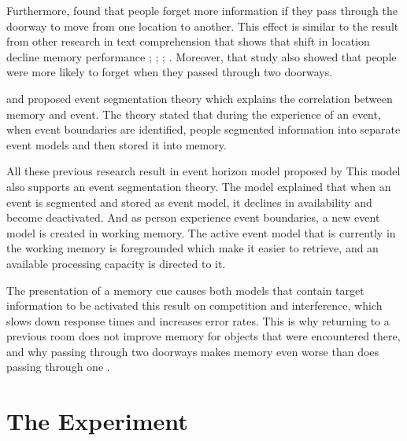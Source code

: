 
Furthermore, \cite{Radvansky2010} found that people forget more information if they pass through the doorway to move from
one location to another.
This
effect is similar to the result from other research in text comprehension that shows that shift
in location decline memory performance \citep{Curiel2002}; \citep{Haenggi1995}; \citep{Radvansky2010}; \citep{Radvansky2003}.
Moreover, that study also showed that people were more likely to forget when they passed through two doorways.

\cite{Kurby2008} and \cite{Swallow2009} proposed event segmentation theory
which explains the correlation between memory and event.
 The theory stated that during the experience of an event,
 when event boundaries are identified, people segmented information into separate event models and then stored it into memory.

All these previous research result in event horizon model proposed by \cite{Radvansky2012}
This model also supports an event segmentation theory. The model explained that when an event is
segmented and stored as event model, it declines in availability and become deactivated. And
as person experience event boundaries, a new event model is created in working memory. The
active event model that is currently in the working memory is foregrounded which make it easier
to retrieve, and an available processing capacity is directed to it.

The presentation of a memory cue causes both models that contain target information to
be activated this result on competition and interference, which slows down response times and
increases error rates. This is why returning to a previous room does not improve memory for
objects that were encountered there, and why passing through two doorways makes memory even
worse than does passing through one \citep{Radvansky2011}.


\section{The Experiment}

